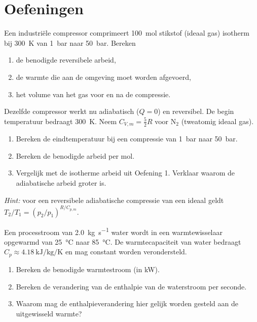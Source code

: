 \section{Oefeningen}


\begin{oefening}
Een industri\"ele compressor comprimeert \SI{100}{\mole} stikstof (ideaal gas) isotherm bij \SI{300}{\kelvin} van \SI{1}{\bar} naar \SI{50}{\bar}. Bereken
\begin{enumerate}
\item[(a)] de benodigde reversibele arbeid,
\item[(b)] de warmte die aan de omgeving moet worden afgevoerd,
\item[(c)] het volume van het gas voor en na de compressie.
\end{enumerate}
\end{oefening}

\begin{oefening}
Dezelfde compressor werkt nu adiabatisch ($Q = 0$) en reversibel. De begin temperatuur bedraagt \SI{300}{\kelvin}. Neem $C_{V,m} = \frac{5}{2}R$ voor $\mathrm{N_2}$ (tweatomig ideaal gas).
\begin{enumerate}
\item[(a)] Bereken de eindtemperatuur bij een compressie van \SI{1}{\bar} naar \SI{50}{\bar}.
\item[(b)] Bereken de benodigde arbeid per mol.
\item[(c)] Vergelijk met de isotherme arbeid uit Oefening 1. Verklaar waarom de adiabatische arbeid groter is.
\end{enumerate}
\emph{Hint:} voor een reversibele adiabatische compressie van een ideaal geldt $T_2/T_1 = (p_2/p_1)^{R/C_{p,m}}$.    
\end{oefening}

\begin{oefening}
Een processtroom van \SI{2.0}{\kilogram\per\second} water wordt in een warmtewisselaar opgewarmd van \SI{25}{\celsius} naar \SI{85}{\celsius}. De warmtecapaciteit van water bedraagt $C_p \approx \SI{4.18}{\kilo\joule\per\kilogram\per\kelvin}$ en mag constant worden verondersteld.
\begin{enumerate}
\item[(a)] Bereken de benodigde warmtestroom (in \si{\kilo\watt}).
\item[(b)] Bereken de verandering van de enthalpie van de waterstroom per seconde.
\item[(c)] Waarom mag de enthalpieverandering hier gelijk worden gesteld aan de uitgewisseld warmte?
\end{enumerate}    
\end{oefening}

